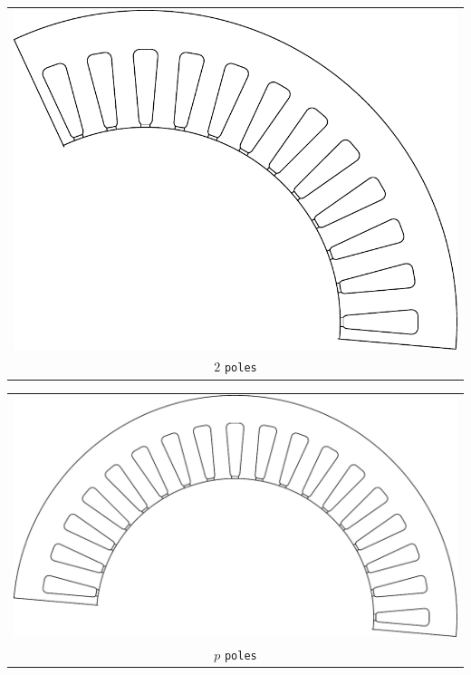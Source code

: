 \documentclass[a4paper,11pt,oneside]{report}
\begin{document}
\begin{tabular}{c}
\includegraphics[scale=0.75]{../SPM/examples/stators/2pole} 
\\
$ 2 $ \texttt{poles}
\end{tabular}
\vspace{5mm}

\begin{tabular}{c}
\includegraphics[scale=0.75]{../SPM/examples/stators/ppole} 
\\
$ p $ \texttt{poles}
\end{tabular}
\vspace{5mm}
\end{document}
